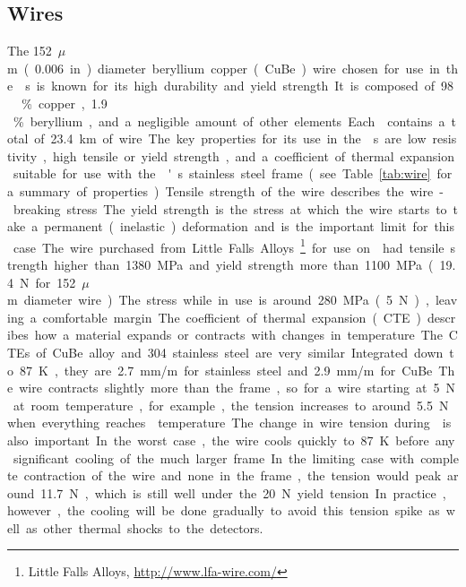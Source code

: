 \subsection{Wires}
\label{sec:fdsp-apa-wires}

The \SI{152}{$\mu$m} (\SI{.006}{in}) diameter beryllium copper (CuBe) wire chosen for use in the s is known for its high durability and yield strength. It is composed of \num{98}\,\% copper, \num{1.9}\,\% beryllium, and a negligible amount of other elements. Each  contains a total of \SI{23.4}{km} of wire.  

The key properties for its use in the s are low resistivity, high tensile or yield strength, and a coefficient of thermal expansion suitable for use with the 's stainless steel frame (see Table~\ref{tab:wire} for a summary of properties).  Tensile strength of the wire describes the wire-breaking stress.  The yield strength is the stress at which the wire starts to take a permanent (inelastic) deformation and is the important limit for this case. The wire purchased from Little Falls Alloys~\footnote{Little Falls Alloys\texttrademark, \url{http://www.lfa-wire.com/}} for use on  had tensile strength higher than \SI{1380}{MPa} and yield strength more than \SI{1100}{MPa} (\SI{19.4}{N} for \SI{152}{$\mu$m} diameter wire).  The stress while in use is around \SI{280}{MPa} (\SI{5}{N}), leaving a comfortable margin.

The coefficient of thermal expansion (CTE) describes how a material expands or contracts with changes in temperature.  The CTEs of CuBe alloy and \num{304} stainless steel are very similar.  Integrated down to \SI{87}{K}, they are \SI{2.7}{mm/m} for stainless steel and \SI{2.9}{mm/m} for CuBe. The wire contracts slightly more than the frame, so for a wire starting at \SI{5}{N} at room temperature, for example, the tension increases to around \SI{5.5}{N} when everything reaches \lar temperature.  

The change in wire tension during \cooldown is also important.  In the worst case, the wire cools quickly to \SI{87}{K} before any significant cooling of the much larger frame.  In the limiting case with complete contraction of the wire and none in the frame, the tension would peak around \SI{11.7}{N}, which is still well under the \SI{20}{N} yield tension. In practice, however, the cooling will be done gradually to avoid this tension spike as well as other thermal shocks to the detectors.

